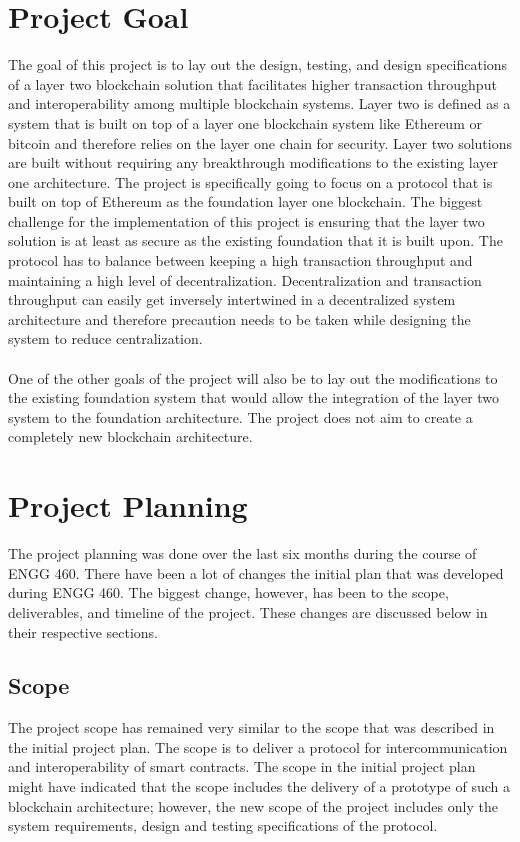 \documentclass[a4paper,twoside,phd]{BYUPhys}
\begin{document}
\section{Project Goal}
The goal of this project is to lay out the design, testing, and design specifications of a layer two blockchain solution that facilitates higher transaction throughput and interoperability among multiple blockchain systems. Layer two is defined as a system that is built on top of a layer one blockchain system like Ethereum or bitcoin and therefore relies on the layer one chain for security. Layer two solutions are built without requiring any breakthrough modifications to the existing layer one architecture. The project is specifically going to focus on a protocol that is built on top of Ethereum as the foundation layer one blockchain. The biggest challenge for the implementation of this project is ensuring that the layer two solution is at least as secure as the existing foundation that it is built upon. The protocol has to balance between keeping a high transaction throughput and maintaining a high level of decentralization. Decentralization and transaction throughput can easily get inversely intertwined in a decentralized system architecture and therefore precaution needs to be taken while designing the system to reduce centralization.
\\
\\ One of the other goals of the project will also be to lay out the modifications to the existing foundation system that would allow the integration of the layer two system to the foundation architecture. The project does not aim to create a completely new blockchain architecture.
\section{Project Planning}
The project planning was done over the last six months during the course of ENGG 460. There have been a lot of changes the initial plan that was developed during ENGG 460. The biggest change, however, has been to the scope, deliverables, and timeline of the project. These changes are discussed below in their respective sections.

\subsection{Scope}
The project scope has remained very similar to the scope that was described in the initial project plan. The scope is to deliver a protocol for intercommunication and interoperability of smart contracts. The scope in the initial project plan might have indicated that the scope includes the delivery of a prototype of such a blockchain architecture; however, the new scope of the project includes only the system requirements, design and testing specifications of the protocol. 
\end{document}
